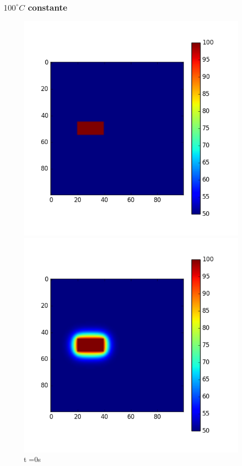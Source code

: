 \documentclass{article}
\begin{document}
\subsubsection{$100^\circ C$ constante}
\begin{figure}[H]
  \includegraphics[width=\linewidth]{abiertasCte0.png}
  \caption{t =0s}\label{fig:awesome_image1}
\endminipage\hfill
{}
  \includegraphics[width=\linewidth]{abiertasCte100.png}

\end{figure}
\end{document}
